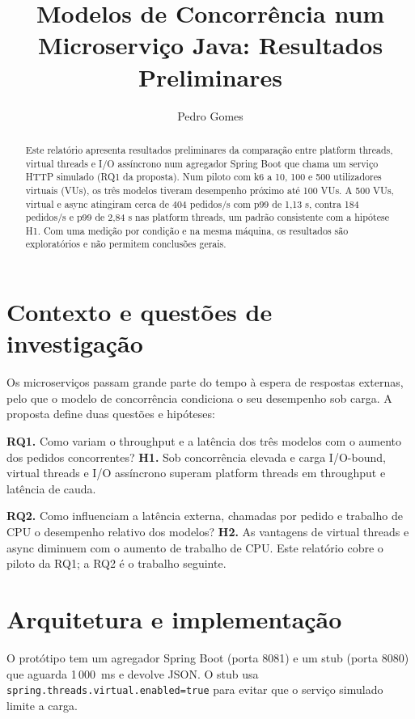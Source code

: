 \documentclass[sigplan]{acmart}
\begin{document}
\title{Modelos de Concorrência num Microserviço Java: Resultados Preliminares}

\author{Pedro Gomes}

\begin{abstract}
Este relatório apresenta resultados preliminares da comparação entre platform threads, virtual threads e I/O assíncrono num agregador Spring Boot que chama um serviço HTTP simulado (RQ1 da proposta). Num piloto com k6 a 10, 100 e 500 utilizadores virtuais (VUs), os três modelos tiveram desempenho próximo até 100 VUs. A 500 VUs, virtual e async atingiram cerca de 404 pedidos/s com p99 de 1,13 s, contra 184 pedidos/s e p99 de 2,84 s nas platform threads, um padrão consistente com a hipótese H1. Com uma medição por condição e na mesma máquina, os resultados são exploratórios e não permitem conclusões gerais.
\end{abstract}

\pagestyle{plain}
\maketitle

\section{Contexto e questões de investigação}
Os microserviços passam grande parte do tempo à espera de respostas externas, pelo que o modelo de concorrência condiciona o seu desempenho sob carga. A proposta define duas questões e hipóteses:

\noindent\textbf{RQ1.} Como variam o throughput e a latência dos três modelos com o aumento dos pedidos concorrentes?
\textbf{H1.} Sob concorrência elevada e carga I/O-bound, virtual threads e I/O assíncrono superam platform threads em throughput e latência de cauda.

\noindent\textbf{RQ2.} Como influenciam a latência externa, chamadas por pedido e trabalho de CPU o desempenho relativo dos modelos?
\textbf{H2.} As vantagens de virtual threads e async diminuem com o aumento de trabalho de CPU. Este relatório cobre o piloto da RQ1; a RQ2 é o trabalho seguinte.

\section{Arquitetura e implementação}
O protótipo tem um agregador Spring Boot (porta 8081) e um stub (porta 8080) que aguarda 1\,000~ms e devolve JSON. O stub usa \texttt{spring.threads.virtual.enabled=true} para evitar que o serviço simulado limite a carga.
\end{document}
